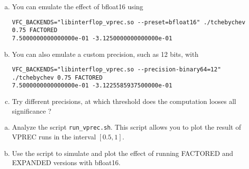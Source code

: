 \begin{question}
    \begin{enumerate}[(a)]
        \item You can emulate the effect of bfloat16 using
              \begin{verbatim}
VFC_BACKENDS="libinterflop_vprec.so --preset=bfloat16" ./tchebychev 0.75 FACTORED
7.5000000000000000e-01 -3.1250000000000000e-01
\end{verbatim}
        \item You can also emulate a custom precision, such as 12 bits, with
              \begin{verbatim}
VFC_BACKENDS="libinterflop_vprec.so --precision-binary64=12" ./tchebychev 0.75 FACTORED
7.5000000000000000e-01 -3.1225585937500000e-01
\end{verbatim}
        \item Try different precisions, at which threshold does the computation looses all significance ?
    \end{enumerate}
\end{question}

\begin{question}
    \begin{enumerate}[(a)]
        \item Analyze the script {\tt run\_vprec.sh}. This script allows you to plot the result of VPREC runs in the interval $[0.5,1]$.
        \item Use the script to simulate and plot the effect of running FACTORED and EXPANDED versions with bfloat16.
    \end{enumerate}
\end{question}
